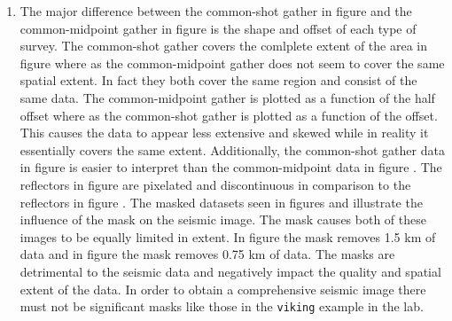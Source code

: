 \begin{enumerate}
\item The major difference between the common-shot gather in figure  and the common-midpoint gather in figure  is the shape and offset of each type of survey. The common-shot gather covers the comlplete extent of the area in figure  where as the common-midpoint gather does not seem to cover the same spatial extent. In fact they both cover the same region and consist of the same data. The common-midpoint gather is plotted as a function of the half offset where as the common-shot gather is plotted as a function of the offset. This causes the data to appear less extensive and skewed while in reality it essentially covers the same extent. Additionally, the common-shot gather data in figure  is easier to interpret than the common-midpoint data in figure . The reflectors in figure  are pixelated and discontinuous in comparison to the reflectors in figure . The masked datasets seen in figures  and  illustrate the influence of the mask on the seismic image. The mask causes both of these images to be equally limited in extent. In figure  the mask removes 1.5 km of data and in figure  the mask removes 0.75 km of data. The masks are detrimental to the seismic data and negatively impact the quality and spatial extent of the data. In order to obtain a comprehensive seismic image there must not be significant masks like those in the \texttt{viking} example in the lab.
\end{enumerate}